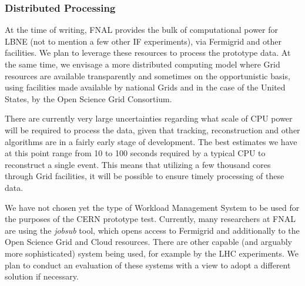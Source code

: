 \subsubsection{Distributed Processing}
At the time of writing, FNAL provides the bulk of computational power for LBNE (not to mention a few other IF experiments), via Fermigrid and other facilities.
We plan to leverage these resources to process the prototype data. At the same time, we envisage a more distributed computing model where Grid resources
are available transparently and sometimes on the opportunistic basis, using facilities made available by national Grids and in the case of the United States, by
the Open Science Grid Consortium.

There are currently very large uncertainties regarding what scale of CPU power will be required to process the data, given that tracking, reconstruction and
other algorithms are in a fairly early stage of development. The best estimates we have at this point range from 10 to 100 seconds required by a typical
CPU to reconstruct a single event. This means that utilizing a few thousand cores through Grid facilities, it will be possible to ensure timely processing of these data.

We have not chosen yet the type of Workload Management System to be used for the purposes of the CERN prototype test. Currently, many researchers at FNAL
are using the \textit{jobsub} tool, which opens access to Fermigrid and additionally to the Open Science Grid and Cloud resources. There are other capable (and arguably
more sophisticated) system being used, for example by the LHC experiments. We plan to conduct an evaluation of these systems with a view to adopt a different
solution if necessary.



%

